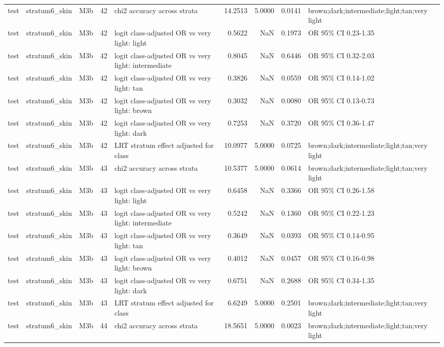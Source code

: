 \begin{tabular}{lllrlrrrl}
test & stratum6\_skin & M3b & 42 & chi2 accuracy across strata & 14.2513 & 5.0000 & 0.0141 & brown;dark;intermediate;light;tan;very light \\
test & stratum6\_skin & M3b & 42 & logit class-adjusted OR vs very light: light & 0.5622 & NaN & 0.1973 & OR 95\% CI 0.23-1.35 \\
test & stratum6\_skin & M3b & 42 & logit class-adjusted OR vs very light: intermediate & 0.8045 & NaN & 0.6446 & OR 95\% CI 0.32-2.03 \\
test & stratum6\_skin & M3b & 42 & logit class-adjusted OR vs very light: tan & 0.3826 & NaN & 0.0559 & OR 95\% CI 0.14-1.02 \\
test & stratum6\_skin & M3b & 42 & logit class-adjusted OR vs very light: brown & 0.3032 & NaN & 0.0080 & OR 95\% CI 0.13-0.73 \\
test & stratum6\_skin & M3b & 42 & logit class-adjusted OR vs very light: dark & 0.7253 & NaN & 0.3720 & OR 95\% CI 0.36-1.47 \\
test & stratum6\_skin & M3b & 42 & LRT stratum effect adjusted for class & 10.0977 & 5.0000 & 0.0725 & brown;dark;intermediate;light;tan;very light \\
test & stratum6\_skin & M3b & 43 & chi2 accuracy across strata & 10.5377 & 5.0000 & 0.0614 & brown;dark;intermediate;light;tan;very light \\
test & stratum6\_skin & M3b & 43 & logit class-adjusted OR vs very light: light & 0.6458 & NaN & 0.3366 & OR 95\% CI 0.26-1.58 \\
test & stratum6\_skin & M3b & 43 & logit class-adjusted OR vs very light: intermediate & 0.5242 & NaN & 0.1360 & OR 95\% CI 0.22-1.23 \\
test & stratum6\_skin & M3b & 43 & logit class-adjusted OR vs very light: tan & 0.3649 & NaN & 0.0393 & OR 95\% CI 0.14-0.95 \\
test & stratum6\_skin & M3b & 43 & logit class-adjusted OR vs very light: brown & 0.4012 & NaN & 0.0457 & OR 95\% CI 0.16-0.98 \\
test & stratum6\_skin & M3b & 43 & logit class-adjusted OR vs very light: dark & 0.6751 & NaN & 0.2688 & OR 95\% CI 0.34-1.35 \\
test & stratum6\_skin & M3b & 43 & LRT stratum effect adjusted for class & 6.6249 & 5.0000 & 0.2501 & brown;dark;intermediate;light;tan;very light \\
test & stratum6\_skin & M3b & 44 & chi2 accuracy across strata & 18.5651 & 5.0000 & 0.0023 & brown;dark;intermediate;light;tan;very light \\

\end{tabular}
